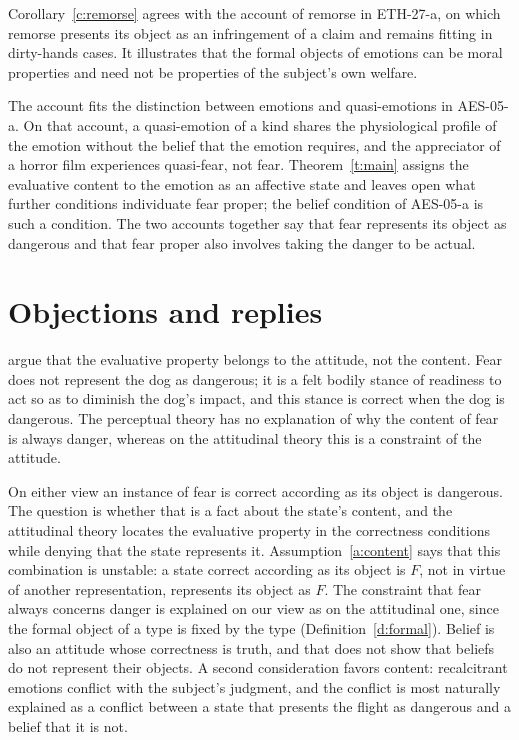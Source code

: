 \documentclass{situationist-preprint}
\begin{document}
Corollary~\ref{c:remorse} agrees with the account of remorse in ETH-27-a, on which remorse presents its object as an infringement of a claim and remains fitting in dirty-hands cases. It illustrates that the formal objects of emotions can be moral properties and need not be properties of the subject's own welfare.

The account fits the distinction between emotions and quasi-emotions in AES-05-a. On that account, a quasi-emotion of a kind shares the physiological profile of the emotion without the belief that the emotion requires, and the appreciator of a horror film experiences quasi-fear, not fear. Theorem~\ref{t:main} assigns the evaluative content to the emotion as an affective state and leaves open what further conditions individuate fear proper; the belief condition of AES-05-a is such a condition. The two accounts together say that fear represents its object as dangerous and that fear proper also involves taking the danger to be actual.

\section{Objections and replies}

\begin{objection}
\citet{DeonnaTeroni2015} argue that the evaluative property belongs to the attitude, not the content. Fear does not represent the dog as dangerous; it is a felt bodily stance of readiness to act so as to diminish the dog's impact, and this stance is correct when the dog is dangerous. The perceptual theory has no explanation of why the content of fear is always danger, whereas on the attitudinal theory this is a constraint of the attitude.
\end{objection}

\begin{reply}
On either view an instance of fear is correct according as its object is dangerous. The question is whether that is a fact about the state's content, and the attitudinal theory locates the evaluative property in the correctness conditions while denying that the state represents it. Assumption~\ref{a:content} says that this combination is unstable: a state correct according as its object is $F$, not in virtue of another representation, represents its object as $F$. The constraint that fear always concerns danger is explained on our view as on the attitudinal one, since the formal object of a type is fixed by the type (Definition~\ref{d:formal}). Belief is also an attitude whose correctness is truth, and that does not show that beliefs do not represent their objects. A second consideration favors content: recalcitrant emotions conflict with the subject's judgment, and the conflict is most naturally explained as a conflict between a state that presents the flight as dangerous and a belief that it is not.
\end{reply}
\end{document}
